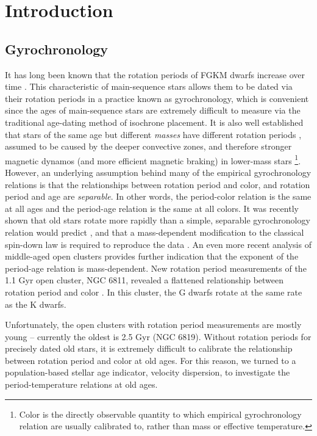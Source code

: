 \section{Introduction}

\subsection{Gyrochronology}
It has long been known that the rotation periods of FGKM dwarfs increase over
time \citep{skumanich1972}.
This characteristic of main-sequence stars allows them to be dated via their
rotation periods in a practice known as gyrochronology, which is convenient
since the ages of main-sequence stars are extremely difficult to measure via
the traditional age-dating method of isochrone placement.
It is also well established that stars of the same age but different {\it
masses} have different rotation periods , assumed to be
caused by the deeper convective zones, and therefore stronger magnetic dynamos
(and more efficient magnetic braking) in lower-mass stars
\footnote{Color is the directly observable quantity to which empirical
gyrochronology relation are usually calibrated to, rather than mass or
effective temperature.}.
However, an underlying assumption behind many of the empirical gyrochronology
relations \citep[\eg][]{barnes2003, barnes2007, mamajek2008, meibom2011,
angus2015, angus2019} is that the relationships between rotation period and
color, and rotation period and age are {\it separable}.
In other words, the period-color relation is the same at all ages and the
period-age relation is the same at all colors.
It was recently shown that old stars rotate more rapidly than a simple,
separable gyrochronology relation would predict \citep{angus2015,
vansaders2016, vansaders2018, metcalfe2019}, and that a mass-dependent
modification to the classical \citet{skumanich1972} spin-down law is required
to reproduce the data \citep{vansaders2016, vansaders2018}.
An even more recent analysis of middle-aged open clusters provides further
indication that the exponent of the period-age relation is mass-dependent.
New rotation period measurements of the 1.1 Gyr open cluster, NGC 6811,
revealed a flattened relationship between rotation period and color
\citep{curtis2019}.
In this cluster, the G dwarfs rotate at the same rate as the K dwarfs.

Unfortunately, the open clusters with rotation period measurements are mostly
young -- currently the oldest is 2.5 Gyr (NGC 6819).
Without rotation periods for precisely dated old stars, it is extremely
difficult to calibrate the relationship between rotation period and color at
old ages.
For this reason, we turned to a population-based stellar age indicator,
velocity dispersion, to investigate the period-temperature relations at old
ages.

